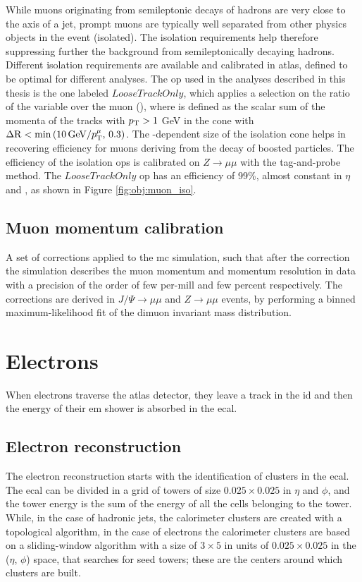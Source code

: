 While muons originating from semileptonic decays of hadrons are very close to the axis of a jet, prompt muons are typically well separated from other physics objects in the event (isolated). The isolation requirements help therefore suppressing further the background from semileptonically decaying hadrons. Different isolation requirements are available and calibrated in \gls{atlas}, defined to be optimal for different analyses. 
The \gls{op} used in the analyses described in this thesis is the one labeled $LooseTrackOnly$, which applies a selection on the ratio of the 
variable \ptvar over the muon \pt (\ptmu), where \ptvar is defined as the scalar sum of the momenta of the tracks with $p_{\rm T}>1$ GeV in the cone with 
$\Delta\mathrm{R} < \min \left(  10 \, \mathrm{GeV}/p_\mathrm{T}^\mu , \, 0.3\right) $. The \pt-dependent size of the isolation cone helps in recovering efficiency for muons deriving from the decay of boosted particles. The efficiency of the isolation \glspl{op} is calibrated on $Z\rightarrow \mu \mu$ with the tag-and-probe method. The $LooseTrackOnly$ \gls{op} has an efficiency of 99\%, almost constant in $\eta$ and \pt, as shown in Figure \ref{fig:obj:muon_iso}. 

\subsection{Muon momentum calibration}
A set of corrections applied to the \gls{mc} simulation, such that after the correction the simulation describes the muon momentum and momentum resolution in data with a precision of the order of few per-mill and few percent respectively. 
The corrections are derived in $J/\Psi \rightarrow \mu \mu$ and $Z\rightarrow \mu \mu$ events, by performing a binned maximum-likelihood fit of the dimuon 
invariant mass distribution. 

\section{Electrons}

When electrons traverse the \gls{atlas} detector, they leave a track in the \gls{id} and then the energy of their \gls{em} shower is absorbed in the \gls{ecal}.

\subsection{Electron reconstruction}

The electron reconstruction \cite{ATL-PHYS-PUB-2011-006,Aad:2014nim,ATLAS-CONF-2016-024} starts with the identification of clusters in the \gls{ecal}. 
The \gls{ecal} can be divided in a grid of towers of size $0.025\times0.025$ in $\eta$ and $\phi$, and the tower energy is the sum of the 
energy of all the cells belonging to the tower. 
While, in the case of hadronic jets, the calorimeter clusters are created with a topological 
algorithm, in the case of electrons the calorimeter clusters are based on a sliding-window algorithm \cite{ATL-LARG-PUB-2008-002} 
with a size of $3\times5$ in units of $0.025\times0.025$ in the ($\eta$, $\phi$) space, that searches for seed towers; these are the centers around which clusters are built.   

